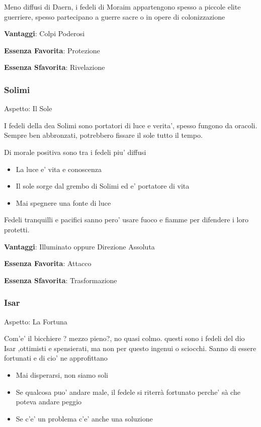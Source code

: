 \documentclass[a4paper,11pt,twoside,openany]{book}
\begin{document}
Meno diffusi di Daern, i fedeli di Moraim appartengono spesso a piccole elite guerriere, spesso partecipano a guerre sacre o in opere di colonizzazione 


\textbf{Vantaggi}: Colpi Poderosi

\textbf{Essenza Favorita}: Protezione

\textbf{Essenza Sfavorita}: Rivelazione

\bigskip
\subsubsection{Solimi}

Aspetto: Il Sole
\bigskip

I fedeli della dea Solimi sono portatori di luce e verita', spesso fungono da oracoli. Sempre ben abbronzati, potrebbero fissare il sole tutto il tempo.

Di morale positiva sono tra i fedeli piu' diffusi

\begin{itemize}
	\item La luce e' vita e conoscenza
	\item Il sole sorge dal grembo di Solimi ed e' portatore di vita
	\item Mai spegnere una fonte di luce
\end{itemize}

Fedeli tranquilli e pacifici sanno pero' usare fuoco e fiamme per difendere i loro protetti.

\textbf{Vantaggi}: Illuminato oppure Direzione Assoluta

\textbf{Essenza Favorita}: Attacco

\textbf{Essenza Sfavorita}: Trasformazione
\bigskip

\subsubsection{Isar}

Aspetto: La Fortuna
\bigskip

Com'e' il bicchiere ? mezzo pieno?, no quasi colmo. questi sono i fedeli del dio Isar ,ottimisti e spensierati, ma non per questo ingenui o sciocchi. Sanno di essere fortunati e di cio' ne approfittano

\begin{itemize}
	\item Mai disperarsi, non siamo soli 
	\item Se qualcosa puo' andare male, il fedele si riterrà fortunato perche' sà che poteva andare peggio
	\item Se c'e' un problema c'e' anche una soluzione
\end{itemize}
\end{document}
